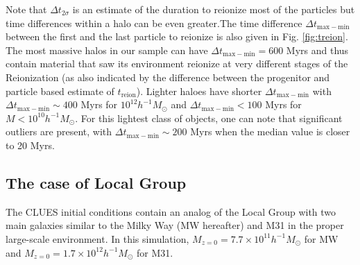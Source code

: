 \documentclass[twocolumn]{aastex61}
\begin{document}
Note that $\Delta t_{2\sigma}$ is an estimate of the duration to reionize most of the particles but time differences within a halo can be even greater.The time difference $\Delta t_\mathrm{max-min}$ between the first and the last particle to reionize is also given in Fig. \ref{fig:treion}. The most massive halos in our sample can have $\Delta t_\mathrm{max-min}=600$ Myrs and thus contain material that saw its environment reionize at very different stages of the Reionization (as also indicated by the difference between the progenitor and particle based estimate of $t_\mathrm{reion}$). Lighter haloes have shorter $\Delta t_\mathrm{max-min}$ with $\Delta t_\mathrm{max-min}\sim 400$ Myrs for $10^{12} h^{-1}M_\odot$ and $\Delta t_\mathrm{max-min}< 100$ Myrs for $M<10^{10} h^{-1} M_\odot$. For this lightest class of objects, one can note that significant outliers are present, with $\Delta t_\mathrm{max-min}\sim 200$ Myrs when the median value is closer to 20 Myrs.


\subsection{The case of Local Group}


The CLUES initial conditions contain an analog of the Local Group with two main galaxies similar to the Milky Way (MW hereafter) and M31 in the proper large-scale environment. In this simulation, $M_{z=0}=7.7\times 10^{11} h^{-1} M_\odot$ for MW and $M_{z=0}=1.7 \times 10^{12} h^{-1} M_\odot$ for M31.
\end{document}
